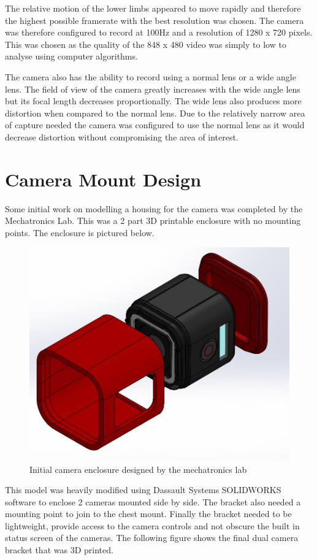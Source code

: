 The relative motion of the lower limbs appeared to move rapidly and therefore the highest possible framerate with the best resolution was chosen. The camera was therefore configured to record at 100Hz and a resolution of 1280 x 720 pixels. This was chosen as the quality of the 848 x 480 video was simply to low to analyse using computer algorithms.

The camera also has the ability to record using a normal lens or a wide angle lens. The field of view of the camera greatly increases with the wide angle lens but its focal length decreases proportionally. The wide lens also produces more distortion when compared to the normal lens. Due to the relatively narrow area of capture needed the camera was configured to use the normal lens as it would decrease distortion without compromising the area of interest.
   

\section{Camera Mount Design}

Some initial work on modelling a housing for the camera was completed by the Mechatronics Lab. This was a 2 part 3D printable enclosure with no mounting points. The enclosure is pictured below.

\begin{figure}[!ht] 
\captionsetup{width=0.6\linewidth, font=small}  
\includegraphics[width=0.6\linewidth]{figures/sylvanexploded.JPG}
\caption{Initial camera enclosure designed by the mechatronics lab}
\label{fig:sylvanexploded}
\end{figure}

This model was heavily modified using Dassault Systems SOLIDWORKS software to enclose 2 cameras mounted side by side. The bracket also needed a mounting point to join to the chest mount. Finally the bracket needed to be lightweight, provide access to the camera controls and not obscure the built in status screen of the cameras. The following figure shows the final dual camera bracket that was 3D printed.

